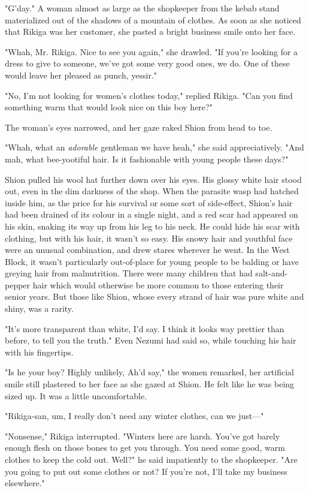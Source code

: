 "G'day." A woman almost as large as the shopkeeper from the kebab stand
materialized out of the shadows of a mountain of clothes. As soon as she
noticed that Rikiga was her customer, she pasted a bright business smile
onto her face.

"Whah, Mr. Rikiga. Nice to see you again," she drawled. "If you're
looking for a dress to give to someone, we've got some very good ones,
we do. One of these would leave her pleased as punch, yessir."

"No, I'm not looking for women's clothes today," replied Rikiga. "Can
you find something warm that would look nice on this boy here?"

The woman's eyes narrowed, and her gaze raked Shion from head to toe.

"Whah, what an \emph{adorable} gentleman we have heah," she said
appreciatively. "And mah, what bee-yootiful hair. Is it fashionable with
young people these days?"

Shion pulled his wool hat further down over his eyes. His glossy white
hair stood out, even in the dim darkness of the shop. When the parasite
wasp had hatched inside him, as the price for his survival or some sort
of side-effect, Shion's hair had been drained of its colour in a single
night, and a red scar had appeared on his skin, snaking its way up from
his leg to his neck. He could hide his scar with clothing, but with his
hair, it wasn't so easy. His snowy hair and youthful face were an
unusual combination, and drew stares wherever he went. In the West
Block, it wasn't particularly out-of-place for young people to be
balding or have greying hair from malnutrition. There were many children
that had salt-and-pepper hair which would otherwise be more common to
those entering their senior years. But those like Shion, whose every
strand of hair was pure white and shiny, was a rarity.

"It's more transparent than white, I'd say. I think it looks way
prettier than before, to tell you the truth." Even Nezumi had said so,
while touching his hair with his fingertips.

"Is he your boy? Highly unlikely, Ah'd say," the women remarked, her
artificial smile still plastered to her face as she gazed at Shion. He
felt like he was being sized up. It was a little uncomfortable.

"Rikiga-san, um, I really don't need any winter clothes, can we just---"

"Nonsense," Rikiga interrupted. "Winters here are harsh. You've got
barely enough flesh on those bones to get you through. You need some
good, warm clothes to keep the cold out. Well?" he said impatiently to
the shopkeeper. "Are you going to put out some clothes or not? If you're
not, I'll take my business elsewhere."

